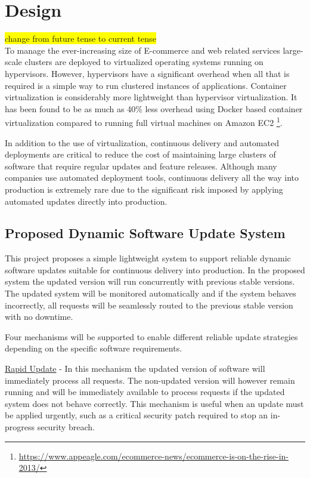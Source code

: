\documentclass[a4paper,11pt,twoside]{article}
\begin{document}
\clearpage
\section{Design} \label{Design}
\colorbox{yellow}{change from future tense to current tense}\\
To manage the ever-increasing size of E-commerce and web related services large-scale clusters are deployed to virtualized operating systems running on hypervisors. However, hypervisors have a significant overhead when all that is required is a simple way to run clustered instances of applications. Container virtualization is considerably more lightweight than hypervisor virtualization. It has been found to be as much as 40\% less overhead using Docker based container virtualization compared to running full virtual machines on Amazon EC2 \footnote{\url{https://www.appeagle.com/ecommerce-news/ecommerce-is-on-the-rise-in-2013/}}.

In addition to the use of virtualization, continuous delivery and automated deployments are critical to reduce the cost of maintaining large clusters of software that require regular updates and feature releases. Although many companies use automated deployment tools, continuous delivery all the way into production is extremely rare due to the significant risk imposed by applying automated updates directly into production.

\subsection{Proposed Dynamic Software Update System}\label{modes} 
This project proposes a simple lightweight system to support reliable dynamic software updates suitable for continuous delivery into production. In the proposed system the updated version will run concurrently with previous stable versions. The updated system will be monitored automatically and if the system behaves incorrectly, all requests will be seamlessly routed to the previous stable version with no downtime.

Four mechanisms will be supported to enable different reliable update strategies depending on the specific software requirements.

\underline{Rapid Update} -  In this mechanism the updated version of software will immediately process all requests. The non-updated version will however remain running and will be immediately available to process requests if the updated system does not behave correctly. This mechanism is useful when an update must be applied urgently, such as a critical security patch required to stop an in-progress security breach.
\end{document}
